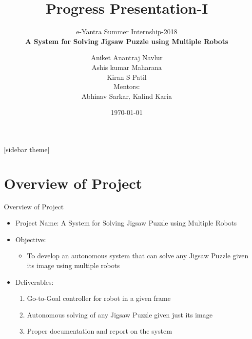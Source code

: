 \documentclass[10pt,a4paper]{beamer}
\begin{document}
	\title{Progress Presentation-I}
	\subtitle{e-Yantra Summer Internship-2018 \\ $ $\textbf{A System for Solving Jigsaw Puzzle using Multiple Robots}$ $}
	\author{$ $Aniket Anantraj Navlur$ $\\$ $Ashis kumar Maharana$ $\\$ $Kiran S Patil$ $\\ \vspace{1em}
	Mentors: \\$ $Abhinav Sarkar, Kalind Karia$ $}
	\date{\today}
	\frame{\titlepage}

[sidebar theme]
\section{Overview of Project}
\begin{frame}{Overview of Project}
	
	\begin{itemize}
		\item Project Name: A System for Solving Jigsaw Puzzle using Multiple Robots
		\item Objective:
		\begin{itemize}
			\item To develop an autonomous system that can solve any Jigsaw Puzzle given its image using multiple robots 
		\end{itemize}
		\item Deliverables:
		\begin{enumerate}
			\item Go-to-Goal controller for robot in a given frame
			\item Autonomous solving of any Jigsaw Puzzle given just its image
			\item Proper documentation and report on the system
		\end{enumerate}
	\end{itemize}
\end{frame}
\end{document}
